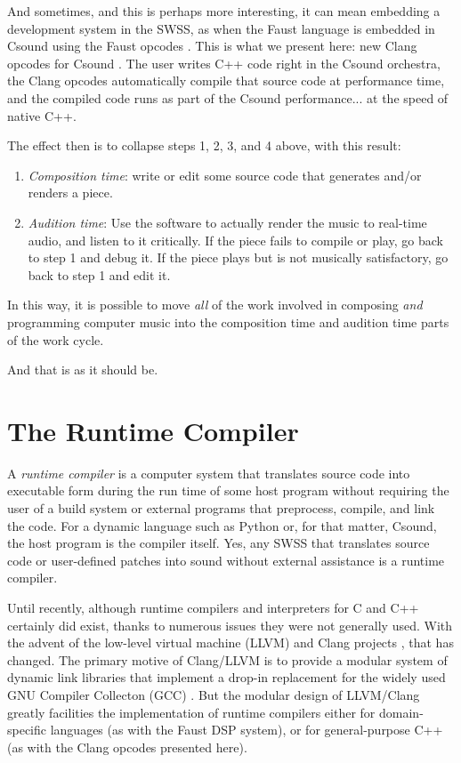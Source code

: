 \documentclass[letterpaper, 12pt]{article}
\begin{document}
And sometimes, and this is perhaps more interesting, it can mean embedding a development system in the SWSS, as when the Faust language \citep{faust, orlarey2009faust} is embedded in Csound using the Faust opcodes \citep{Lazzarini2014, faustcompile, faustdsp}. This is what we present here: new Clang opcodes for Csound \citep{clangopcodes}. The user writes C++ code right in the Csound orchestra, the Clang opcodes automatically compile that source code at performance time, and the compiled code runs as part of the Csound performance... at the speed of native C++.

The effect then is to collapse steps 1, 2, 3, and 4 above, with this result:

\begin{enumerate}
\item \textit{Composition time}: write or edit some source code that generates and/or renders a piece.
\item \textit{Audition time}: Use the software to actually render the music to real-time audio, and listen to it critically. If the piece fails to compile or play, go back to step 1 and debug it. If the piece plays but is not musically satisfactory, go back to step 1 and edit it.
\end{enumerate}

\indent In this way, it is possible to move \textit{all} of the work involved in composing \textit{and} programming computer music into the composition time and audition time parts of the work cycle.

And that is as it should be.

\section{The Runtime Compiler}

A \textit{runtime compiler} is a computer system that translates source code into executable form during the run time of some host program without requiring the user of a build system or external programs that preprocess, compile, and link the code. For a dynamic language such as Python or, for that matter, Csound, the host program is the compiler itself. Yes, any SWSS that translates source code or user-defined patches into sound without external assistance is a runtime compiler.

Until recently, although runtime compilers and interpreters for C and C++ certainly did exist, thanks to numerous issues they were not generally used. With the advent of the low-level virtual machine (LLVM) and Clang projects \citep{llvm}, that has changed. The primary motive of Clang/LLVM is to provide a modular system of dynamic link libraries that implement a drop-in replacement for the widely used GNU Compiler Collecton (GCC) \citep{gcc}. But the modular design of LLVM/Clang greatly facilities the implementation of runtime compilers either for domain-specific languages (as with the Faust DSP system), or for general-purpose C++ (as with the Clang opcodes presented here).
\end{document}

